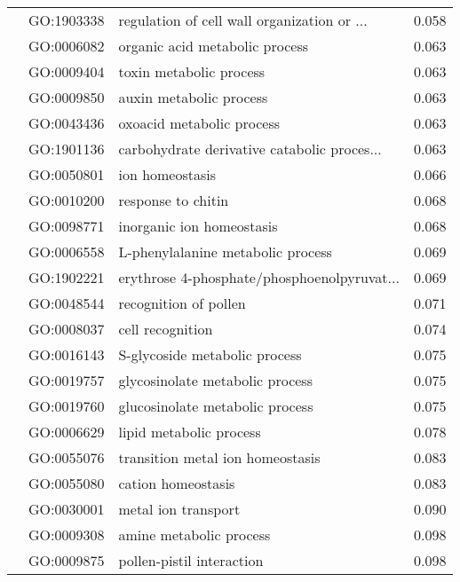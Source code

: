 \begin{longtable}{lllr}
   & GO:1903338 &  regulation of cell wall organization or ... &         0.058 \\
   & GO:0006082 &               organic acid metabolic process &         0.063 \\
   & GO:0009404 &                      toxin metabolic process &         0.063 \\
   & GO:0009850 &                      auxin metabolic process &         0.063 \\
   & GO:0043436 &                    oxoacid metabolic process &         0.063 \\
   & GO:1901136 &  carbohydrate derivative catabolic proces... &         0.063 \\
   & GO:0050801 &                              ion homeostasis &         0.066 \\
   & GO:0010200 &                           response to chitin &         0.068 \\
   & GO:0098771 &                    inorganic ion homeostasis &         0.068 \\
   & GO:0006558 &            L-phenylalanine metabolic process &         0.069 \\
   & GO:1902221 &  erythrose 4-phosphate/phosphoenolpyruvat... &         0.069 \\
   & GO:0048544 &                        recognition of pollen &         0.071 \\
   & GO:0008037 &                             cell recognition &         0.074 \\
   & GO:0016143 &                S-glycoside metabolic process &         0.075 \\
   & GO:0019757 &              glycosinolate metabolic process &         0.075 \\
   & GO:0019760 &              glucosinolate metabolic process &         0.075 \\
   & GO:0006629 &                      lipid metabolic process &         0.078 \\
   & GO:0055076 &             transition metal ion homeostasis &         0.083 \\
   & GO:0055080 &                           cation homeostasis &         0.083 \\
   & GO:0030001 &                          metal ion transport &         0.090 \\
   & GO:0009308 &                      amine metabolic process &         0.098 \\
   & GO:0009875 &                    pollen-pistil interaction &         0.098 \\

\end{longtable}
